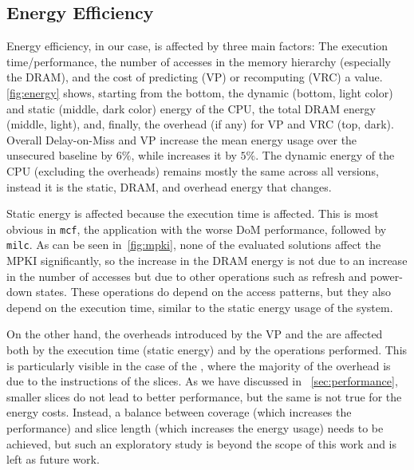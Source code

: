 \subsection{Energy Efficiency}
\label{sec:energy}

Energy efficiency, in our case, is affected by three main factors: The execution time/performance, the number of accesses in the memory hierarchy (especially the DRAM), and the cost of predicting (VP) or recomputing (VRC) a value.
\autoref{fig:energy} shows, starting from the bottom, the dynamic (bottom, light color) and static (middle, dark color) energy of the CPU, the total DRAM energy (middle, light), and, finally, the overhead (if any) for VP and VRC (top, dark). %
Overall Delay-on-Miss and VP increase the mean energy usage over the unsecured baseline by $6\%$, while \recomp{} increases it by $5\%$. The dynamic energy of the CPU (excluding the overheads) remains mostly the same across all versions, instead it is the static, DRAM, and overhead energy that changes.

Static energy is affected because the execution time is affected. This is most obvious in \texttt{mcf}, the application with the worse DoM performance, followed by \texttt{milc}. As can be seen in~\autoref{fig:mpki}, none of the evaluated solutions affect the MPKI significantly, so the increase in the DRAM energy is not due to an increase in the number of accesses but due to other operations such as refresh and power-down states. These operations do depend on the access patterns, but they also depend on the execution time, similar to the static energy usage of the system.

On the other hand, the overheads introduced by the VP and the \recomp{} are affected both by the execution time (static energy) and by the operations performed. This is particularly visible in the case of the \recomp{}, where the majority of the overhead is due to the instructions of the slices. As we have discussed in ~\autoref{sec:performance}, smaller slices do not lead to better performance, but the same is not true for the energy costs. Instead, a balance between coverage (which increases the performance) and slice length (which increases the energy usage) needs to be achieved, but such an exploratory study is beyond the scope of this work and is left as future work.


